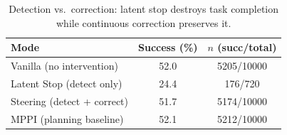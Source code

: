 \begin{table}[t]
\centering
\caption{Detection vs.\ correction: latent stop destroys task completion while continuous correction preserves it.}
\label{tab:detection_vs_correction}
\begin{tabular}{lcc}
\toprule
Mode & Success (\%) & $n$ (succ/total) \\
\midrule
Vanilla (no intervention) & 52.0 & 5205/10000 \\
Latent Stop (detect only) & 24.4 & 176/720 \\
Steering (detect + correct) & 51.7 & 5174/10000 \\
MPPI (planning baseline) & 52.1 & 5212/10000 \\
\bottomrule
\end{tabular}
\end{table}
